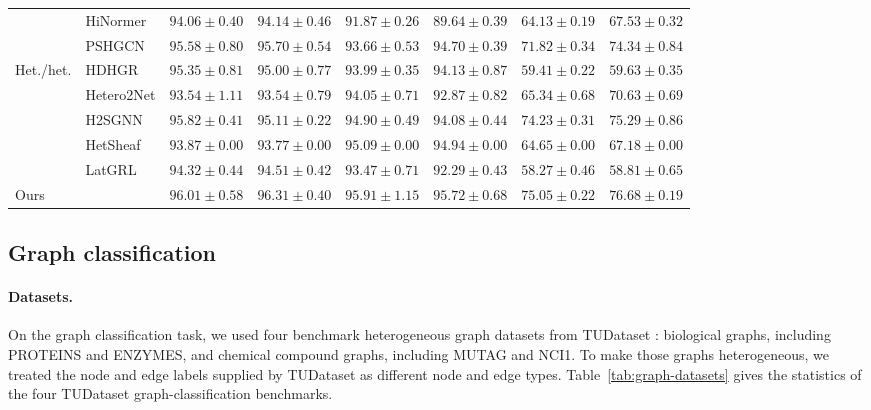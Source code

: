 \begin{table}[t]
{\begin{tabular}{llcccccc}
    & HiNormer
    & $94.06 \pm 0.40$
    & $94.14 \pm 0.46$
    & $91.87 \pm 0.26$
    & $89.64 \pm 0.39$
    & $64.13 \pm 0.19$
    & $67.53 \pm 0.32$ \\

    & PSHGCN
    & $95.58 \pm 0.80$
    & $95.70 \pm 0.54$
    & $93.66 \pm 0.53$
    & $94.70 \pm 0.39$
    & $71.82 \pm 0.34$
    & $74.34 \pm 0.84$ \\
    \midrule

    \multirow{5}{*}{Het./het.}
    & HDHGR
    & $95.35 \pm 0.81$
    & $95.00 \pm 0.77$
    & $93.99 \pm 0.35$
    & $94.13 \pm 0.87$
    & $59.41 \pm 0.22$
    & $59.63 \pm 0.35$ \\

    & Hetero2Net
    & $93.54 \pm 1.11$
    & $93.54 \pm 0.79$
    & $94.05 \pm 0.71$
    & $92.87 \pm 0.82$
    & $65.34 \pm 0.68$
    & $70.63 \pm 0.69$ \\

    & H2SGNN
    & $95.82 \pm 0.41$
    & $95.11 \pm 0.22$
    & $94.90 \pm 0.49$
    & $94.08 \pm 0.44$
    & $74.23 \pm 0.31$
    & $75.29 \pm 0.86$ \\

    & HetSheaf
    & $93.87 \pm 0.00$
    & $93.77 \pm 0.00$
    & $95.09 \pm 0.00$
    & $94.94 \pm 0.00$
    & $64.65 \pm 0.00$
    & $67.18 \pm 0.00$ \\

    & LatGRL
    & $94.32 \pm 0.44$
    & $94.51 \pm 0.42$
    & $93.47 \pm 0.71$
    & $92.29 \pm 0.43$
    & $58.27 \pm 0.46$
    & $58.81 \pm 0.65$ \\
    \midrule

    Ours
    & \textbf{\method{}}
    & $\mathbf{96.01 \pm 0.58}$
    & $\mathbf{96.31 \pm 0.40}$
    & $\mathbf{95.91 \pm 1.15}$
    & $\mathbf{95.72 \pm 0.68}$
    & $\mathbf{75.05 \pm 0.22}$
    & $\mathbf{76.68 \pm 0.19}$ \\
    \bottomrule
  \end{tabular}%
  }
\end{table}



\subsection{Graph classification}
\label{sec:setup-graph}
\paragraph{Datasets.}
On the graph classification task, we used four benchmark heterogeneous graph datasets from TUDataset \cite{morris2020tudataset}: biological graphs, including PROTEINS and ENZYMES, and chemical compound graphs, including MUTAG and NCI1. To make those graphs heterogeneous, we treated the node and edge labels supplied by TUDataset as different node and edge types. Table~\ref{tab:graph-datasets} gives the statistics of the four TUDataset graph-classification benchmarks.

